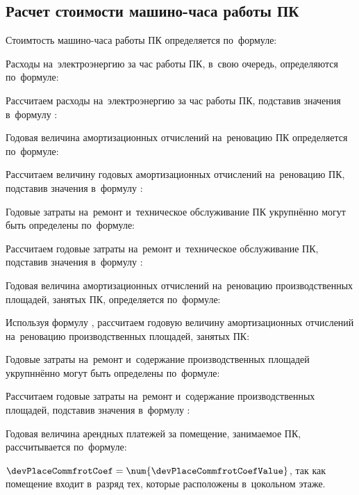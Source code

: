 \subsection{Расчет стоимости машино-часа работы ПК}
\label{sec:economics:cpuclocktime}

Стоимтость машино-часа работы ПК определяется по~формуле:
\pcPcHourCostEquation

Расходы на~электроэнергию за час работы ПК, в~свою очередь, определяются по~формуле:
\energyHourCostEquation

Рассчитаем расходы на~электроэнергию за час работы ПК, подставив значения в~формулу :
\energyHourCostFormulaApplied

Годовая величина амортизационных отчислений на~реновацию ПК определяется по~формуле:
\pcAmortizationCostEquation

Рассчитаем величину годовых амортизационных отчислений на~реновацию ПК, подставив значения в~формулу :
\pcAmortizationCostFormulaApplied

Годовые затраты на~ремонт и~техническое обслуживание ПК укрупнённо могут быть определены по~формуле:
\pcPcSupportCostEquation

Рассчитаем годовые затраты на~ремонт и~техническое обслуживание ПК, подставив значения в~формулу :
\pcPcSupportCostFormulaApplied

Годовая величина амортизационных отчислений на~реновацию производственных площадей, занятых ПК, определяется по~формуле:
\devPlaceAmortizationCostEquation

Используя формулу , рассчитаем годовую величину амортизационных отчислений на~реновацию производственных площадей, занятых ПК:
\devPlaceAmortizationCostFormulaApplied

Годовые затраты на~ремонт и~содержание производственных площадей укрупннённо могут быть определены по~формуле:
\devPlaceSupportCostEquation

Рассчитаем годовые затраты на~ремонт и~содержание производственных площадей, подставив значения в~формулу :
\devPlaceSupportCostFormulaApplied

Годовая величина арендных платежей за помещение, занимаемое ПК, рассчитывается по~формуле:
\devPlaceRentCostEquation

\(\devPlaceCommfrotCoef = \num{\devPlaceCommfrotCoefValue}\), так как помещение входит в~разряд тех, которые расположены в~цокольном этаже.

